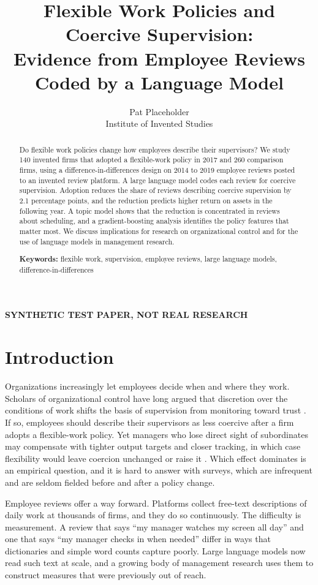 \documentclass[12pt]{article}
\title{Flexible Work Policies and Coercive Supervision:\\Evidence from Employee Reviews Coded by a Language Model}
\author{Pat Placeholder\\Institute of Invented Studies}
\date{}
\begin{document}
\maketitle
\begin{center}\textbf{SYNTHETIC TEST PAPER, NOT REAL RESEARCH}\end{center}
\begin{abstract}
\noindent Do flexible work policies change how employees describe their supervisors? We study 140 invented firms that adopted a flexible-work policy in 2017 and 260 comparison firms, using a difference-in-differences design on 2014 to 2019 employee reviews posted to an invented review platform. A large language model codes each review for coercive supervision. Adoption reduces the share of reviews describing coercive supervision by 2.1 percentage points, and the reduction predicts higher return on assets in the following year. A topic model shows that the reduction is concentrated in reviews about scheduling, and a gradient-boosting analysis identifies the policy features that matter most. We discuss implications for research on organizational control and for the use of language models in management research.

\medskip\noindent\textbf{Keywords:} flexible work, supervision, employee reviews, large language models, difference-in-differences
\end{abstract}

\section{Introduction}
Organizations increasingly let employees decide when and where they work. Scholars of organizational control have long argued that discretion over the conditions of work shifts the basis of supervision from monitoring toward trust \citep{fictional2009control}. If so, employees should describe their supervisors as less coercive after a firm adopts a flexible-work policy. Yet managers who lose direct sight of subordinates may compensate with tighter output targets and closer tracking, in which case flexibility would leave coercion unchanged or raise it \citep{fictional2014tracking}. Which effect dominates is an empirical question, and it is hard to answer with surveys, which are infrequent and are seldom fielded before and after a policy change.

Employee reviews offer a way forward. Platforms collect free-text descriptions of daily work at thousands of firms, and they do so continuously. The difficulty is measurement. A review that says ``my manager watches my screen all day'' and one that says ``my manager checks in when needed'' differ in ways that dictionaries and simple word counts capture poorly. Large language models now read such text at scale, and a growing body of management research uses them to construct measures that were previously out of reach.
\end{document}
